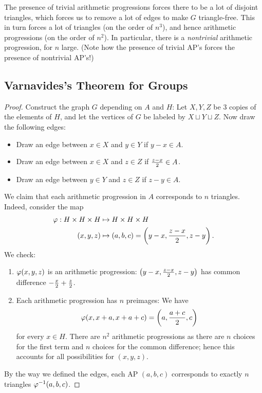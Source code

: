 The presence of trivial arithmetic progressions forces there to be a lot of disjoint triangles, which forces us to remove a lot of edges to make $G$ triangle-free. This in turn forces a lot of triangles (on the order of $n^3$), and hence arithmetic progressions (on the order of $n^2$). In particular, there is a {\it nontrivial} arithmetic progression, for $n$ large. (Note how the presence of trivial AP's forces the presence of nontrivial AP's!)

\subsection{Varnavides's Theorem for Groups}
\begin{proof}
 Construct the graph $G$ depending on $A$ and $H$: 
Let $X,Y,Z$ be 3 copies of the elements of $H$, and let the vertices of $G$ be labeled by $X\sqcup Y\sqcup Z$.
Now draw the following edges:
\begin{itemize}
\item
Draw an edge between $x\in X$ and $y\in Y$ if $y-x\in A$.%
\item
Draw an edge between $x\in X$ and $z\in Z$ if $\frac{z-x}{2}\in A$. %
\item
Draw an edge between $y\in Y$ and $z\in Z$ if $z-y\in A$. %
\end{itemize}
We claim that each arithmetic progression in $A$ corresponds to $n$ triangles. 
Indeed, consider the map %
\begin{align*}
\varphi: H\times H\times H&\mapsto H\times H\times H\\
(x,y,z)&\mapsto (a,b,c)=\left( {y-x,\frac{z-x}{2},z-y} \right).
\end{align*}
We check:
\begin{enumerate}
\item
$\varphi(x,y,z)$ is an arithmetic progression: $\left( {y-x,\frac{z-x}{2},z-y} \right)$  has common difference $-\frac{x}{2}+\frac{z}{2}$.
\item
Each arithmetic progression has $n$ preimages: We have
\[
\varphi(x,x+a,x+a+c)=\left( {a,\frac{a+c}{2},c} \right)
\]
for every $x\in H$. There are $n^2$ arithmetic progressions as there are $n$ choices for the first term and $n$ choices for the common difference; hence this accounts for all possibilities for $(x,y,z)$.
\end{enumerate}
By the way we defined the edges, each AP $(a,b,c)$ corresponds to exactly $n$ triangles $\varphi^{-1}(a,b,c)$.


\end{proof}

